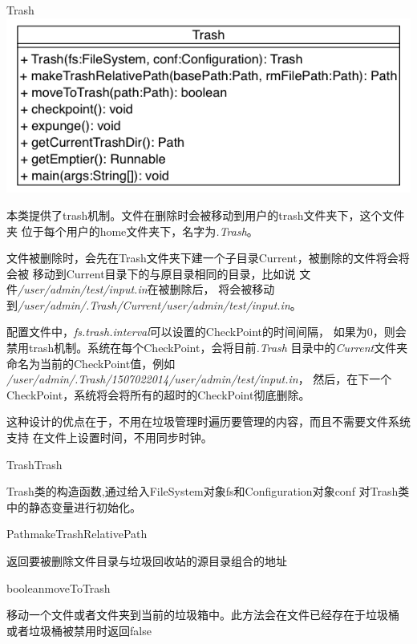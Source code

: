 \begin{XeClass}{Trash}
\includegraphics[width=\textwidth]{cdig/Trash.png}
     
 本类提供了trash机制。文件在删除时会被移动到用户的trash文件夹下，这个文件夹
 位于每个用户的home文件夹下，名字为\emph{.Trash}。
 
 文件被删除时，会先在Trash文件夹下建一个子目录Current，被删除的文件将会将会被
 移动到Current目录下的与原目录相同的目录，比如说
 文件\emph{/user/admin/test/input.in}在被删除后，
 将会被移动到\emph{/user/admin/.Trash/Current/user/admin/test/input.in}。
 
 配置文件中，\emph{fs.trash.interval}可以设置的CheckPoint的时间间隔，
 如果为0，则会禁用trash机制。系统在每个CheckPoint，会将目前\emph{.Trash}
 目录中的\emph{Current}文件夹命名为当前的CheckPoint值，例如
 \emph{/user/admin/.Trash/1507022014/user/admin/test/input.in}，
 然后，在下一个CheckPoint，系统将会将所有的超时的CheckPoint彻底删除。
 
 这种设计的优点在于，不用在垃圾管理时遍历要管理的内容，而且不需要文件系统支持
 在文件上设置时间，不用同步时钟。

    \begin{XeMethod}{\XePublic}{Trash}{Trash}
         
 Trash类的构造函数,通过给入FileSystem对象fs和Configuration对象conf
 对Trash类中的静态变量进行初始化。

    \end{XeMethod}

    \begin{XeMethod}{\XePrivate}{Path}{makeTrashRelativePath}
         
 返回要被删除文件目录与垃圾回收站的源目录组合的地址

    \end{XeMethod}

    \begin{XeMethod}{\XePublic}{boolean}{moveToTrash}
         
 移动一个文件或者文件夹到当前的垃圾箱中。此方法会在文件已经存在于垃圾桶
 或者垃圾桶被禁用时返回false


\end{XeMethod}
\end{XeClass}
